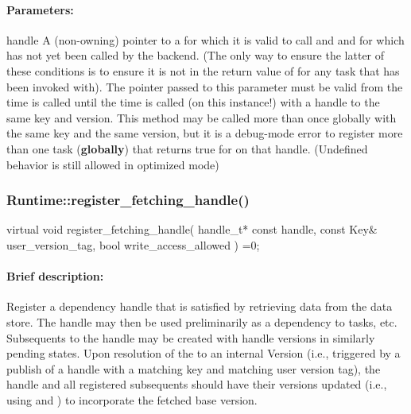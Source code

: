      
     
\paragraph{Parameters:} 
\begin{compactdesc}
\item[handle] A (non-owning) pointer to a  for which it is
       valid to call  and  and for
       which  has not yet been called by the backend.  (The only
       way to ensure the latter of these conditions is to ensure it is not in the return value of
        for any task that  has been invoked with). The pointer
       passed to this parameter must be valid from the time  is called until the time
        is called (on this instance!) with a handle to the same key and version.  This method
       may be called more than once globally with the same key and the same version, but it is a debug-mode
       error to register more than one task ({\bf globally}) that returns true for  on
       that handle.  (Undefined behavior is still allowed in optimized mode)
\end{compactdesc}
    

\subsubsection{Runtime::register\_fetching\_handle()}
\begin{CppCode}
    virtual void
    register_fetching_handle(
      handle_t* const handle,
      const Key& user_version_tag,
      bool write_access_allowed
    ) =0;
\end{CppCode}

\paragraph{Brief description:} Register a dependency handle that is satisfied by retrieving data from the data store.
       The handle may then be used preliminarily as a dependency to tasks, etc.  Subsequents to the handle
       may be created with handle versions in similarly pending states.  Upon resolution of the 
       to an internal Version (i.e., triggered by a publish of a handle with a matching key and matching user
       version tag), the handle and all registered subsequents should have their versions updated (i.e., using
        and ) to incorporate the fetched base version.
     

